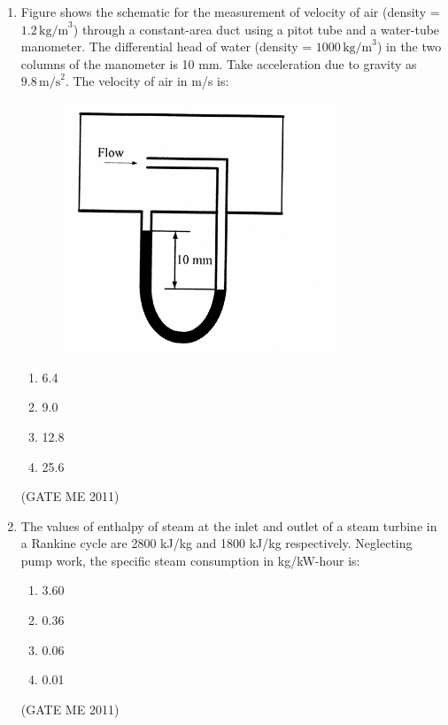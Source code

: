 \documentclass[journal]{IEEEtran}
\begin{document}
\begin{enumerate}
\item Figure shows the schematic for the measurement of velocity of air (density = $1.2\,\text{kg/m}^3$) through a constant-area duct using a pitot tube and a water-tube manometer. The differential head of water (density = $1000\,\text{kg/m}^3$) in the two columns of the manometer is 10 mm. Take acceleration due to gravity as $9.8\,\text{m/s}^2$. The velocity of air in m/s is:

\begin{figure}[H]
    \centering
    \includegraphics[width=0.8\textwidth]{Fig 5.png}
    \caption{}
    \label{fig:question27}
\end{figure}

\begin{multicols}{4}
\begin{enumerate}
\item 6.4  
\item 9.0  
\item 12.8  
\item 25.6  
\end{enumerate}
\end{multicols}  
\hfill (GATE ME 2011)

\item The values of enthalpy of steam at the inlet and outlet of a steam turbine in a Rankine cycle are 2800 kJ/kg and 1800 kJ/kg respectively. Neglecting pump work, the specific steam consumption in kg/kW-hour is:

\begin{multicols}{4}
\begin{enumerate}
\item 3.60  
\item 0.36  
\item 0.06  
\item 0.01  
\end{enumerate}
\end{multicols}  
\hfill (GATE ME 2011)


\end{enumerate}
\end{document}
